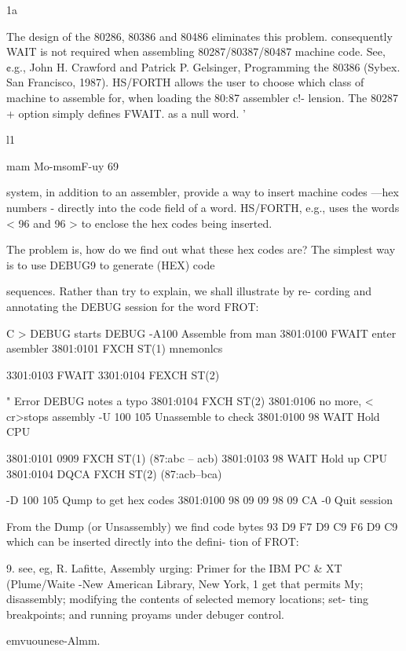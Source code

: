  

1a

The design of the 80286, 80386 and 80486 eliminates this problem. consequently WAIT is not
required when assembling 80287/80387/80487 machine code. See, ¢.g., John H. Crawford and
Patrick P. Gelsinger, Programming the 80386 (Sybex. San Francisco, 1987). HS/FORTH allows
the user to choose which class of machine to assemble for, when loading the 80:87 assembler c!-
lension. The 80287 + option simply deﬁnes FWAIT. as a null word. '

l1

 

mam Mo-msomF-uy 69

system, in addition to an assembler, provide a way to insert
machine codes —hex numbers - directly into the code ﬁeld of a
word. HS/FORTH, e.g., uses the words < 96 and 96 > to enclose
the hex codes being inserted.

The problem is, how do we ﬁnd out what these hex codes are?
The simplest way is to use DEBUG9 to generate (HEX) code

sequences. Rather than try to explain, we shall illustrate by re-
cording and annotating the DEBUG session for the word FROT:

C > DEBUG starts DEBUG
-A100 Assemble from man
3801:0100 FWAIT enter asembler
3801:0101 FXCH ST(1) mnemonlcs

3301:0103 FWAIT
3301:0104 FEXCH ST(2)

" Error DEBUG notes a typo
3801:0104 FXCH ST(2)
3801:0106 no more, < cr>stops assembly
-U 100 105 Unassemble to check
3801:0100 98 WAIT Hold CPU

3801:0101 0909 FXCH ST(1)
(87:abc -- acb)
3801:0103 98 WAIT Hold up CPU
3801:0104 DQCA FXCH ST(2)
(87:acb--bca)

-D 100 105 Qump to get hex codes
3801:0100 98 09 09 98 09 CA
-0 Quit session

From the Dump (or Unsassembly) we ﬁnd code bytes 93 D9 F7
D9 C9 F6 D9 C9 which can be inserted directly into the deﬁni-
tion of FROT:

 

9. see, eg, R. Lafitte, Assembly urging: Primer for the IBM PC & XT (Plume/Waite -New
American Library, New York, 1%
get that permits My; disassembly; modifying the contents of selected memory locations; set-
ting breakpoints; and running proyams under debuger control.

emvuounese-Almm.

